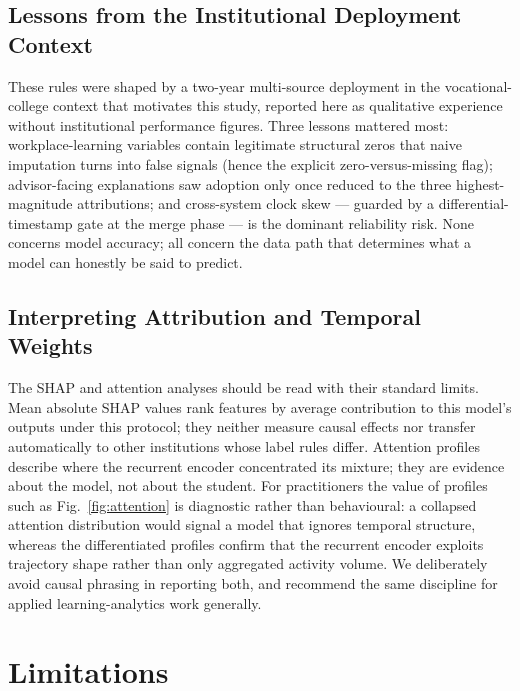 \documentclass[sn-mathphys,Numbered]{sn-jnl}
\begin{document}
\subsection{Lessons from the Institutional Deployment Context}\label{sec:disc_deployment}

These rules were shaped by a two-year multi-source deployment in the vocational-college context that motivates this study, reported here as qualitative experience without institutional performance figures. Three lessons mattered most: workplace-learning variables contain legitimate structural zeros that naive imputation turns into false signals (hence the explicit zero-versus-missing flag); advisor-facing explanations saw adoption only once reduced to the three highest-magnitude attributions; and cross-system clock skew --- guarded by a differential-timestamp gate at the merge phase --- is the dominant reliability risk. None concerns model accuracy; all concern the data path that determines what a model can honestly be said to predict.

\subsection{Interpreting Attribution and Temporal Weights}\label{sec:disc_interpretation}

The SHAP and attention analyses should be read with their standard limits. Mean absolute SHAP values rank features by average contribution to this model's outputs under this protocol; they neither measure causal effects nor transfer automatically to other institutions whose label rules differ. Attention profiles describe where the recurrent encoder concentrated its mixture; they are evidence about the model, not about the student. For practitioners the value of profiles such as Fig.~\ref{fig:attention} is diagnostic rather than behavioural: a collapsed attention distribution would signal a model that ignores temporal structure, whereas the differentiated profiles confirm that the recurrent encoder exploits trajectory shape rather than only aggregated activity volume. We deliberately avoid causal phrasing in reporting both, and recommend the same discipline for applied learning-analytics work generally.

\section{Limitations}\label{sec:limitations}
\end{document}

